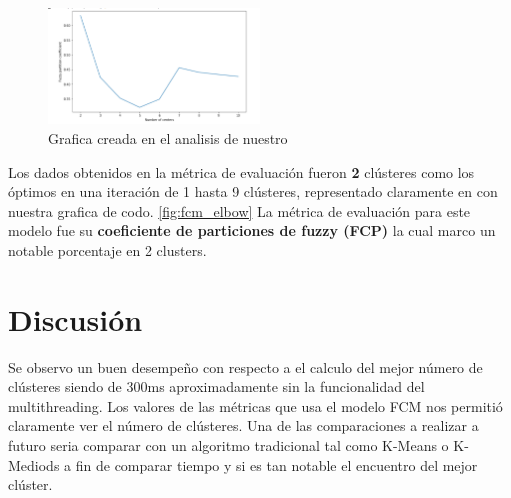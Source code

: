 \documentclass[10pt,journal]{IEEEtran}
\begin{document}
\begin{figure}[ht]
    \centering
    \includegraphics[width=0.50\textwidth]{elbow_centers.png}
    \caption{ Grafica creada en el analisis de nuestro} 
    \label{fig:fcm_elbow}
\end{figure}

Los dados obtenidos en la métrica de evaluación fueron \textbf{2} clústeres como los óptimos en una iteración de 1 hasta 9 clústeres, representado claramente en con nuestra grafica de codo. \autoref{fig:fcm_elbow} La métrica de evaluación para este modelo fue su \textbf{coeficiente de particiones de fuzzy (FCP)} la cual marco un notable porcentaje en 2 clusters.














\section{Discusión}


Se observo un buen desempeño con respecto a el calculo del mejor número de clústeres siendo de 300ms aproximadamente sin la funcionalidad del multithreading. Los valores de las métricas que usa el modelo FCM nos permitió claramente ver el número de clústeres.  Una de las comparaciones a realizar a futuro seria comparar con un algoritmo tradicional tal como K-Means o K-Mediods a fin de comparar tiempo y si es tan notable el encuentro del mejor clúster.



 

\ifCLASSOPTIONcaptionsoff
  \newpage
\fi



\end{document}
